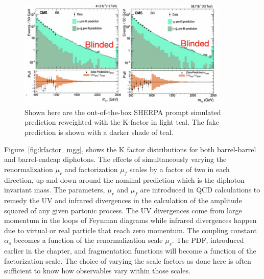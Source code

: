 \begin{figure}[htbp!]
\caption{Shown here are the out-of-the-box SHERPA prompt simulated \mgg prediction reweighted with the K-factor in light teal. The fake prediction is shown with a darker shade of teal.}
\begin{center}
\includegraphics[angle=0,width=0.9\textwidth]{fig/diphotonblinded.png}
\end{center}
\label{fig:SMBackgroundKfactorreweighted}
\end{figure}

Figure~\ref{fig:kfactor_mgg}, shows the K factor distributions for both barrel-barrel and barrel-endcap diphotons. The effects of simultaneously varying the renormalization $\mu_{r}$ and factorization $\mu_{f}$ scales by a factor of two in each direction, up and down around the nominal prediction which is the diphoton invariant mass. The parameters, $\mu_{r}$ and $\mu_{f}$ are introduced in QCD calculations to remedy the UV and infrared divergences in the calculation of the amplitude squared of any given partonic process. The UV divergences come from large momentum in the loops of Feynman diagrams while infrared divergences happen due to virtual or real particle that reach zero momentum. The coupling constant $\alpha_{s}$ becomes a function of the renormalization scale $\mu_{r}$. The PDF, introduced earlier in the chapter, and fragmentation functions will become a function of the factorization scale. The choice of varying the scale factors as done here is often sufficient to know how observables vary within those scales.



